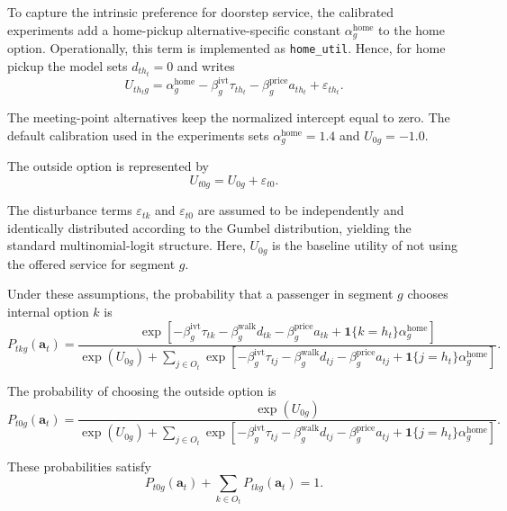 \documentclass[preprint,12pt,authoryear]{elsarticle}
\begin{document}
To capture the intrinsic preference for doorstep service, the calibrated experiments add a home-pickup alternative-specific constant $\alpha_g^{\mathrm{home}}$ to the home option. Operationally, this term is implemented as \texttt{home\_util}. Hence, for home pickup the model sets $d_{th_t}=0$ and writes
\[
U_{th_tg} =
\alpha_g^{\mathrm{home}}
- \beta_g^{\mathrm{ivt}}\tau_{th_t}
- \beta_g^{\mathrm{price}}a_{th_t}
+ \varepsilon_{th_t}.
\]

The meeting-point alternatives keep the normalized intercept equal to zero. The default calibration used in the experiments sets $\alpha_g^{\mathrm{home}} = 1.4$ and $U_{0g} = -1.0$.

The outside option is represented by
\begin{equation}
U_{t0g} = U_{0g} + \varepsilon_{t0}.
\tag{9}\label{eq:outside-utility}
\end{equation}

The disturbance terms $\varepsilon_{tk}$ and $\varepsilon_{t0}$ are assumed to be independently and identically distributed according to the Gumbel distribution, yielding the standard multinomial-logit structure. Here, $U_{0g}$ is the baseline utility of not using the offered service for segment $g$.

Under these assumptions, the probability that a passenger in segment $g$ chooses internal option $k$ is
\begin{equation}
P_{tkg}(\mathbf{a}_t)=
\frac{\exp\!\left[-\beta_g^{\mathrm{ivt}}\tau_{tk}
-\beta_g^{\mathrm{walk}}d_{tk}
-\beta_g^{\mathrm{price}}a_{tk}
+\mathbf{1}\{k=h_t\}\alpha_g^{\mathrm{home}}\right]}
{\exp(U_{0g})
+ \sum_{j\in O_t}\exp\!\left[-\beta_g^{\mathrm{ivt}}\tau_{tj}
-\beta_g^{\mathrm{walk}}d_{tj}
-\beta_g^{\mathrm{price}}a_{tj}
+\mathbf{1}\{j=h_t\}\alpha_g^{\mathrm{home}}\right]}.
\tag{10}\label{eq:choice-prob}
\end{equation}

The probability of choosing the outside option is
\begin{equation}
P_{t0g}(\mathbf{a}_t)=
\frac{\exp(U_{0g})}
{\exp(U_{0g})
+ \sum_{j\in O_t}\exp\!\left[-\beta_g^{\mathrm{ivt}}\tau_{tj}
-\beta_g^{\mathrm{walk}}d_{tj}
-\beta_g^{\mathrm{price}}a_{tj}
+\mathbf{1}\{j=h_t\}\alpha_g^{\mathrm{home}}\right]}.
\tag{11}\label{eq:outside-prob}
\end{equation}

These probabilities satisfy
\begin{equation}
P_{t0g}(\mathbf{a}_t)+\sum_{k\in O_t}P_{tkg}(\mathbf{a}_t)=1.
\tag{12}\label{eq:prob-sum}
\end{equation}
\end{document}
